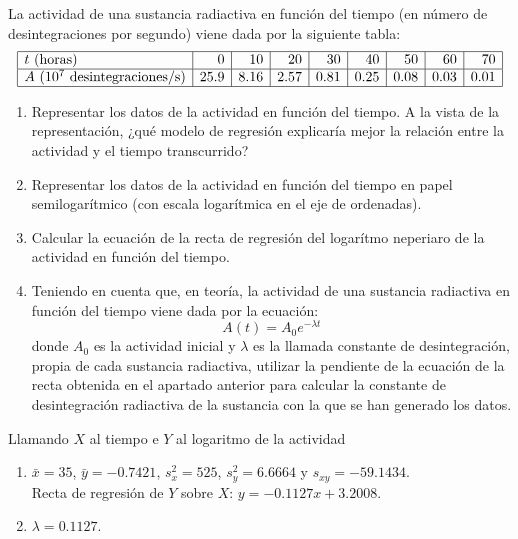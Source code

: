 {La actividad de una sustancia radiactiva en función del tiempo (en número de desintegraciones por segundo)
viene dada por la siguiente tabla:
\[
\begin{array}{|l|r|r|r|r|r|r|r|r|}
\hline
t\text{ (horas)} & 0 & 10 & 20 & 30 & 40 & 50 & 60 & 70 \\
\hline
A\text{ ($10^7$ desintegraciones/s)} & 25.9 & 8.16 & 2.57 & 0.81 & 0.25 & 0.08 & 0.03 & 0.01\\
\hline
\end{array}
\]

\begin{enumerate}
\item Representar los datos de la actividad en función del tiempo.
A la vista de la representación, ¿qué modelo de regresión explicaría mejor la relación entre la actividad y el tiempo
transcurrido?
\item Representar los datos de la actividad en función del tiempo en papel semilogarítmico (con escala logarítmica en
el eje de ordenadas).
\item Calcular la ecuación de la recta de regresión del logarítmo neperiaro de la actividad en función del tiempo.
\item Teniendo en cuenta que, en teoría, la actividad de una sustancia radiactiva en función del tiempo viene dada por
la ecuación:
\[
A(t) = A_0 e^{ - \lambda t}
\]
donde $A_0$ es la actividad inicial y $\lambda$ es la llamada constante de desintegración, propia de cada sustancia
radiactiva, utilizar la pendiente de la ecuación de la recta obtenida en el apartado anterior para calcular la
constante de desintegración radiactiva de la sustancia con la que se han generado los datos.
\end{enumerate}
}
{Llamando $X$ al tiempo e $Y$ al logaritmo de la actividad
\begin{enumerate}[start=3]
\item $\bar x=35$, $\bar y=-0.7421$, $s_x^2=525$, $s_y^2=6.6664$ y $s_{xy}=-59.1434$.\\
Recta de regresión de $Y$ sobre $X$: $y=-0.1127x+3.2008$.
\item $\lambda=0.1127$.
\end{enumerate}
}
{}


